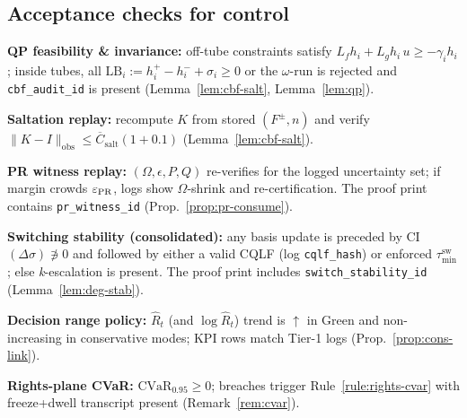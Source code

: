 \subsection{Acceptance checks for control}\label{subsec:ctrl-accept}
\begin{acceptchecks}
\item \textbf{QP feasibility \& invariance:} off-tube constraints satisfy $L_f h_i + L_g h_i\,u \ge -\gamma_i h_i$; inside tubes, all $\mathrm{LB}_i:=h_i^+-h_i^-+\sigma_i\ge 0$ or the $\omega$-run is rejected and \texttt{cbf\_audit\_id} is present (Lemma~\ref{lem:cbf-salt}, Lemma~\ref{lem:qp}).
\item \textbf{Saltation replay:} recompute $K$ from stored $(F^\pm,n)$ and verify $\|K-I\|_{\mathrm{obs}}\le \overline C_{\mathrm{salt}}(1+0.1)$ (Lemma~\ref{lem:cbf-salt}).
\item \textbf{PR witness replay:} $(\Omega,\epsilon,P,Q)$ re-verifies for the logged uncertainty set; if margin crowds $\varepsilon_{\mathrm{PR}}$, logs show $\Omega$-shrink and re-certification. The proof print contains \texttt{pr\_witness\_id} (Prop.~\ref{prop:pr-consume}).
\item \textbf{Switching stability (consolidated):} any basis update is preceded by CI$(\Delta\sigma)\not\ni 0$ and followed by either a valid CQLF (log \texttt{cqlf\_hash}) or enforced $\tau_{\min}^{\mathrm{sw}}$; else \emph{k}-escalation is present. The proof print includes \texttt{switch\_stability\_id} (Lemma~\ref{lem:deg-stab}).
\item \textbf{Decision range policy:} $\hat R_t$ (and $\log \hat R_t$) trend is $\uparrow$ in Green and non-increasing in conservative modes; KPI rows match Tier-1 logs (Prop.~\ref{prop:cons-link}).
\item \textbf{Rights-plane CVaR:} $\mathrm{CVaR}_{0.95}\ge 0$; breaches trigger Rule~\ref{rule:rights-cvar} with freeze+dwell transcript present (Remark~\ref{rem:cvar}).
\end{acceptchecks}
